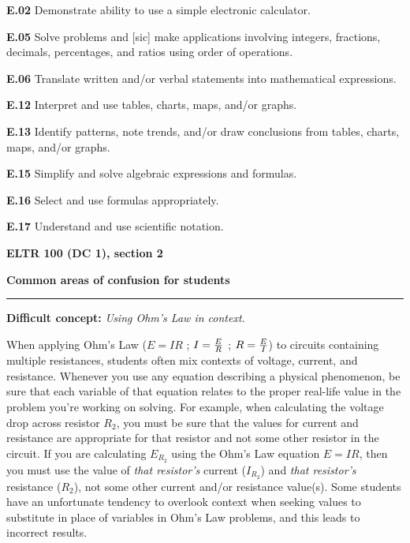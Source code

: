 \item{\bf E.02} Demonstrate ability to use a simple electronic calculator.
\item{\bf E.05} Solve problems and [sic] make applications involving integers, fractions, decimals, percentages, and ratios using order of operations.
\item{\bf E.06} Translate written and/or verbal statements into mathematical expressions.
\item{\bf E.12} Interpret and use tables, charts, maps, and/or graphs.
\item{\bf E.13} Identify patterns, note trends, and/or draw conclusions from tables, charts, maps, and/or graphs.
\item{\bf E.15} Simplify and solve algebraic expressions and formulas.
\item{\bf E.16} Select and use formulas appropriately.
\item{\bf E.17} Understand and use scientific notation.
\medskip






\vfil \eject

\centerline{\bf ELTR 100 (DC 1), section 2} \bigskip 
 
\vskip 10pt

\noindent
{\bf Common areas of confusion for students}

\vskip 5pt

\hrule \vskip 5pt

\vskip 10pt

\noindent
{\bf Difficult concept: } {\it Using Ohm's Law in context.}

When applying Ohm's Law ($E = IR$ ; $I = {E \over R}$ ; $R = {E \over I}$) to circuits containing multiple resistances, students often mix contexts of voltage, current, and resistance.  Whenever you use any equation describing a physical phenomenon, be sure that each variable of that equation relates to the proper real-life value in the problem you're working on solving.  For example, when calculating the voltage drop across resistor $R_2$, you must be sure that the values for current and resistance are appropriate for that resistor and not some other resistor in the circuit.  If you are calculating $E_{R_2}$ using the Ohm's Law equation $E = IR$, then you must use the value of {\it that resistor's} current ($I_{R_2}$) and {\it that resistor's} resistance ($R_2$), not some other current and/or resistance value(s).  Some students have an unfortunate tendency to overlook context when seeking values to substitute in place of variables in Ohm's Law problems, and this leads to incorrect results.


